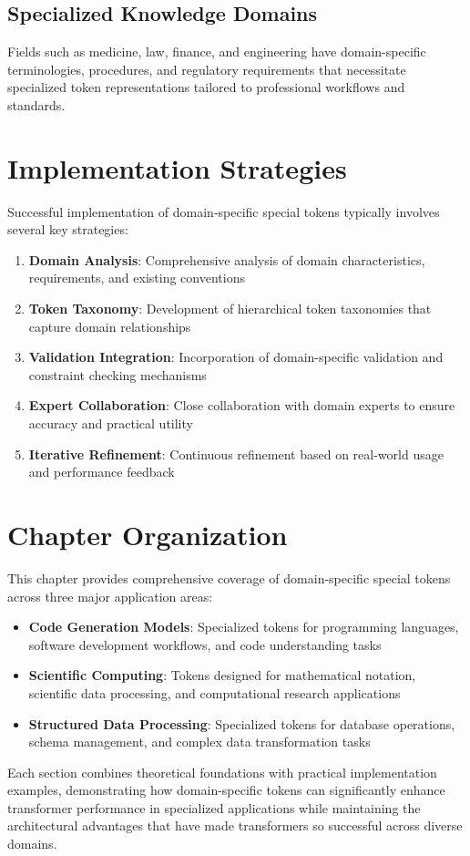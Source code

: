 \subsection{Specialized Knowledge Domains}
Fields such as medicine, law, finance, and engineering have domain-specific terminologies, procedures, and regulatory requirements that necessitate specialized token representations tailored to professional workflows and standards.

\section{Implementation Strategies}

Successful implementation of domain-specific special tokens typically involves several key strategies:

\begin{enumerate}
\item \textbf{Domain Analysis}: Comprehensive analysis of domain characteristics, requirements, and existing conventions
\item \textbf{Token Taxonomy}: Development of hierarchical token taxonomies that capture domain relationships
\item \textbf{Validation Integration}: Incorporation of domain-specific validation and constraint checking mechanisms
\item \textbf{Expert Collaboration}: Close collaboration with domain experts to ensure accuracy and practical utility
\item \textbf{Iterative Refinement}: Continuous refinement based on real-world usage and performance feedback
\end{enumerate}

\section{Chapter Organization}

This chapter provides comprehensive coverage of domain-specific special tokens across three major application areas:

\begin{itemize}
\item \textbf{Code Generation Models}: Specialized tokens for programming languages, software development workflows, and code understanding tasks
\item \textbf{Scientific Computing}: Tokens designed for mathematical notation, scientific data processing, and computational research applications
\item \textbf{Structured Data Processing}: Specialized tokens for database operations, schema management, and complex data transformation tasks
\end{itemize}

Each section combines theoretical foundations with practical implementation examples, demonstrating how domain-specific tokens can significantly enhance transformer performance in specialized applications while maintaining the architectural advantages that have made transformers so successful across diverse domains.